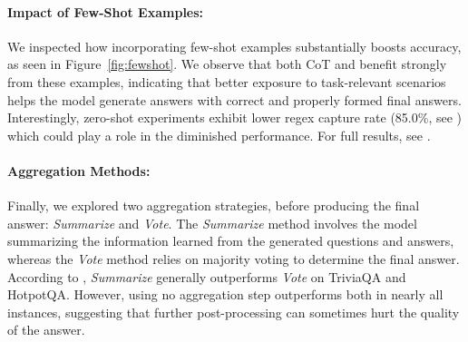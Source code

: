 


\paragraph{Impact of Few-Shot Examples:}
We inspected how incorporating few-shot examples substantially boosts accuracy, as seen in Figure~\ref{fig:fewshot}. We observe that both CoT and \rephrase{} benefit strongly from these examples, indicating that better exposure to task-relevant scenarios helps the model generate answers with correct and properly formed final answers. Interestingly, zero-shot experiments exhibit lower regex capture rate (85.0\%, see ) which could play a role in the diminished performance. For full results, see .

\paragraph{Aggregation Methods:}
Finally, we explored two aggregation strategies, before producing the final answer: \textit{Summarize} and \textit{Vote}. The \textit{Summarize} method involves the model summarizing the information learned from the generated questions and answers, whereas the \textit{Vote} method relies on majority voting to determine the final answer. According to , \textit{Summarize} generally outperforms \textit{Vote} on TriviaQA and HotpotQA. However, using no aggregation step outperforms both in nearly all instances, suggesting that further post-processing can sometimes hurt the quality of the answer.
